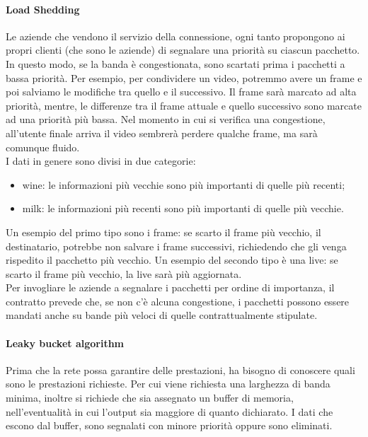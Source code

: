 \documentclass{article}
\begin{document}
\paragraph{Load Shedding}
Le aziende che vendono il servizio della connessione, ogni tanto propongono ai
propri clienti (che sono le aziende) di segnalare una priorità su ciascun
pacchetto. In questo modo, se la banda è congestionata, sono scartati prima i
pacchetti a bassa priorità. Per esempio, per condividere un video, potremmo
avere un frame e poi salviamo le modifiche tra quello e il successivo. Il frame
sarà marcato ad alta priorità, mentre, le differenze tra il frame attuale e
quello successivo sono marcate ad una priorità più bassa. Nel momento in cui si
verifica una congestione, all'utente finale arriva il video sembrerà perdere
qualche frame, ma sarà comunque fluido.\\
I dati in genere sono divisi in due categorie:
\begin{itemize}
	\item wine: le informazioni più vecchie sono più importanti di quelle più
		recenti;

	\item milk: le informazioni più recenti sono più importanti di quelle più
		vecchie.
\end{itemize}
Un esempio del primo tipo sono i frame: se scarto il frame più vecchio, il
destinatario, potrebbe non salvare i frame successivi, richiedendo che gli venga
rispedito il pacchetto più vecchio. Un esempio del secondo tipo è una live:
se scarto il frame più vecchio, la live sarà più aggiornata.\\
Per invogliare le aziende a segnalare i pacchetti per ordine di importanza, il
contratto prevede che, se non c'è alcuna congestione, i pacchetti possono essere
mandati anche su bande più veloci di quelle contrattualmente stipulate.\\

\paragraph{Leaky bucket algorithm}
Prima che la rete possa garantire delle prestazioni, ha bisogno di conoscere
quali sono le prestazioni richieste. Per cui viene richiesta una larghezza di
banda minima, inoltre si richiede che sia assegnato un buffer di memoria,
nell'eventualità in cui l'output sia maggiore di quanto dichiarato. I dati che
escono dal buffer, sono segnalati con minore priorità oppure sono eliminati.\\
\end{document}

